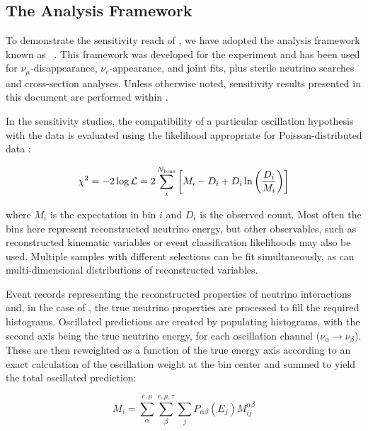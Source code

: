 \subsection{The  Analysis Framework}
\label{sect:methods-cafana}

To demonstrate the sensitivity reach of , we have adopted the analysis framework known as ~\cite{CAFAna}. This framework was developed for the  experiment and has been used for $\nu_\mu$-disappearance, $\nu_e$-appearance, and joint fits, plus sterile neutrino searches and cross-section analyses.  Unless otherwise noted, sensitivity results presented in this document are performed within . %

In the sensitivity studies, the compatibility of a particular oscillation hypothesis with the data is evaluated using the likelihood appropriate for Poisson-distributed data \cite{Tanabashi:2018oca}:

\begin{equation}
    \chi^2 = -2\log\mathcal{L} = 2\sum_i^{N_{\rm bins}}\left[ M_i-D_i+D_i\ln\left({D_i\over M_i}\right) \right]
\end{equation}

where $M_i$ is the  %
expectation in bin $i$ and $D_i$ is the observed count. Most often the bins here represent reconstructed neutrino energy, but other observables, such as reconstructed kinematic variables or event classification likelihoods may also be used. Multiple samples with different selections can be fit simultaneously, as can multi-dimensional distributions of reconstructed variables.

Event records representing the reconstructed properties of neutrino interactions and, in the case of  , the true neutrino properties are processed to fill the required histograms. Oscillated  predictions are created by populating \twod histograms, with the second axis being the true neutrino energy, for each oscillation channel ($\nu_\alpha\to\nu_\beta$). These are then reweighted as a function of the true energy axis according to an exact calculation of the oscillation weight at the bin center %
and summed to yield the total oscillated prediction:

\begin{equation}
    M_i = \sum_\alpha^{e,\mu}\sum_\beta^{e,\mu,\tau}\sum_j P_{\alpha\beta}(E_j)M_{ij}^{\alpha\beta}
    \label{eqn:cafana_ll}
\end{equation}

